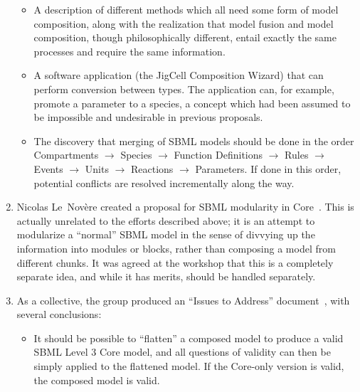 \begin{enumerate}
    \begin{itemize}

    \item A description of different methods which all need some form of
      model composition, along with the realization that model fusion
      and model composition, though philosophically different, entail
      exactly the same processes and require the same information.

    \item A software application (the JigCell Composition Wizard) that
      can perform conversion between types.  The application can, for
      example, promote a parameter to a species, a concept which had
      been assumed to be impossible and undesirable in previous
      proposals.  

    \item The discovery that merging of SBML models should be done in
      the order Compartments $\rightarrow$ Species  $\rightarrow$
      Function Definitions  $\rightarrow$ Rules  $\rightarrow$ Events
      $\rightarrow$ Units  $\rightarrow$ Reactions  $\rightarrow$
      Parameters.  If done in this order, potential conflicts are
      resolved incrementally along the way.

    \end{itemize}

  \item Nicolas Le~Nov\`{e}re created a proposal for SBML modularity in
    Core~\cite{x}.  This is actually unrelated to the efforts described
    above; it is an attempt to modularize a ``normal'' SBML model in the
    sense of divvying up the information into modules or blocks, rather
    than composing a model from different chunks.  It was agreed at the
    workshop that this is a completely separate idea, and while it has
    merits, should be handled separately.

  \item As a collective, the group produced an ``Issues to Address''
    document~\cite{x}, with several conclusions:


    \begin{itemize}

    \item It should be possible to ``flatten'' a composed model to
      produce a valid SBML Level 3 Core model, and all questions of
      validity can then be simply applied to the flattened model.  If
      the Core-only version is valid, the composed model is valid.


\end{itemize}
\end{enumerate}
